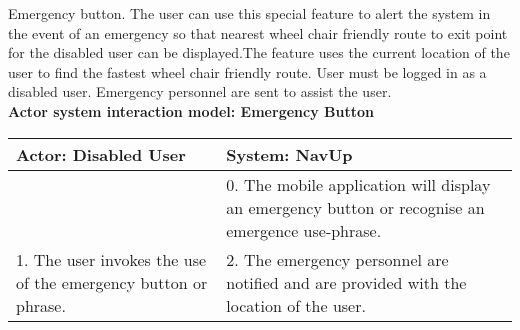 \FuncReq
{Emergency button.}
{The user can use this special feature to alert the system in the event of an emergency so that nearest wheel chair friendly route to exit point for the disabled user can be displayed.The feature uses the current location of the user to find the fastest wheel chair friendly route.}
{User must be logged in as a disabled user.}
{Emergency personnel are sent to assist the user.}
    \\
    \textbf{Actor system interaction model: Emergency Button}\\
    \begin{tabular}{ | p{6cm} | p{6cm} |}
    \hline
    Actor: Disabled User & System: NavUp \\ \hline
     & 0. The mobile application will display an emergency button or recognise an emergence use-phrase.\\ \hline
    1. The user invokes the use of the emergency button or phrase. & 2. The emergency personnel are notified and are provided with the location of the user.\\ \hline   
    \end{tabular}
\\
\bigskip

